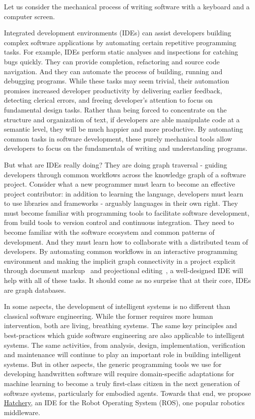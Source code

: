 \documentclass[12pt,initial,twoside,maitrise]{dms}
\numberwithin{equation}{section}
\numberwithin{table}{chapter}
\numberwithin{figure}{chapter}
\begin{document}
Let us consider the mechanical process of writing software with a keyboard and a computer screen.

Integrated development environments (IDEs) can assist developers building complex software applications by automating certain repetitive programming tasks. For example, IDEs perform static analyses and inspections for catching bugs quickly. They can provide completion, refactoring and source code navigation. And they can automate the process of building, running and debugging programs. While these tasks may seem trivial, their automation promises increased developer productivity by delivering earlier feedback, detecting clerical errors, and freeing developer's attention to focus on fundamental design tasks. Rather than being forced to concentrate on the structure and organization of text, if developers are able manipulate code at a semantic level, they will be much happier and more productive. By automating common tasks in software development, these purely mechanical tools allow developers to focus on the fundamentals of writing and understanding programs.

But what are IDEs really doing? They are doing graph traversal - guiding developers through common workflows across the knowledge graph of a software project. Consider what a new programmer must learn to become an effective project contributor: in addition to learning the language, developers must learn to use libraries and frameworks - arguably languages in their own right. They must become familiar with programming tools to facilitate software development, from build tools to version control and continuous integration. They need to become familiar with the software ecosystem and common patterns of development. And they must learn how to collaborate with a distributed team of developers. By automating common workflows in an interactive programming environment and making the implicit graph connectivity in a project explicit through document markup~\cite{goldfarb1981generalized} and projectional editing~\cite{voelter2014towards}, a well-designed IDE will help with all of these tasks. It should come as no surprise that at their core, IDEs are graph databases.

In some aspects, the development of intelligent systems is no different than classical software engineering. While the former requires more human intervention, both are living, breathing systems. The same key principles and best-practices which guide software engineering are also applicable to intelligent systems. The same activities, from analysis, design, implementation, verification and maintenance will continue to play an important role in building intelligent systems. But in other aspects, the generic programming tools we use for developing handwritten software will require domain-specific adaptations for machine learning to become a truly first-class citizen in the next generation of software systems, particularly for embodied agents. Towards that end, we propose \href{https://github.com/duckietown/hatchery}{Hatchery}, an IDE for the Robot Operating System (ROS), one popular robotics middleware.
\end{document}
